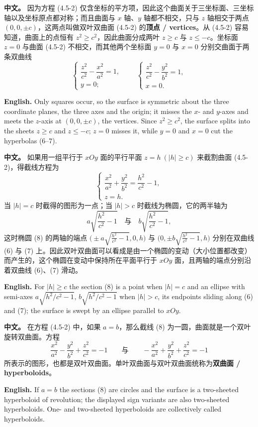 \documentclass[UTF8,11pt,a4paper]{ctexart}
\newcommand{\APS}[2]{\par\noindent\textbf{中文。} #1\par\noindent\textbf{English.} #2\par\smallskip}
\theoremstyle{definition}
\begin{document}
\APS{因为方程 (4.5-2) 仅含坐标的平方项，因此这个曲面关于三坐标面、三坐标轴以及坐标原点都对称；而且曲面与 $x$ 轴、$y$ 轴都不相交，只与 $z$ 轴相交于两点 $(0,0,\pm c)$，这两点叫做双叶双曲面 (4.5-2) 的\textbf{顶点 / vertices}。从 (4.5-2) 容易知道，曲面上的点恒有 $z^2\ge c^2$，因此曲面分成两叶 $z\ge c$ 与 $z\le -c$。坐标面 $z=0$ 与曲面 (4.5-2) 不相交，而其他两个坐标面 $y=0$ 与 $x=0$ 分别交曲面于两条双曲线
\[
\begin{cases}\dfrac{z^2}{c^2}-\dfrac{x^2}{a^2}=1,\\ y=0;\end{cases}\qquad
\begin{cases}\dfrac{z^2}{c^2}-\dfrac{y^2}{b^2}=1,\\ x=0.\end{cases}\tag{6--7}
\]
}{Only squares occur, so the surface is symmetric about the three coordinate planes, the three axes and the origin; it misses the $x$- and $y$-axes and meets the $z$-axis at $(0,0,\pm c)$, the vertices. Since $z^2\ge c^2$, the surface splits into the sheets $z\ge c$ and $z\le -c$; $z=0$ misses it, while $y=0$ and $x=0$ cut the hyperbolas (6--7).}

\APS{如果用一组平行于 $xOy$ 面的平行平面 $z=h\ (|h|\ge c)$ 来截割曲面 (4.5-2)，得截线方程为
\[
\begin{cases}\dfrac{x^2}{a^2}+\dfrac{y^2}{b^2}=\dfrac{h^2}{c^2}-1,\\ z=h.\end{cases}\tag{8}
\]
当 $|h|=c$ 时截得的图形为一点；当 $|h|>c$ 时截线为椭圆，它的两半轴为
\[
a\sqrt{\frac{h^2}{c^2}-1}\quad\text{与}\quad b\sqrt{\frac{h^2}{c^2}-1},
\]
这时椭圆 (8) 的两轴的端点 $\bigl(\pm a\sqrt{\frac{h^2}{c^2}-1},0,h\bigr)$ 与 $\bigl(0,\pm b\sqrt{\frac{h^2}{c^2}-1},h\bigr)$ 分别在双曲线 (6) 与 (7) 上。因此双叶双曲面可以看成是由一个椭圆的变动（大小位置都改变）而产生的，这个椭圆在变动中保持所在平面平行于 $xOy$ 面，且两轴的端点分别沿着双曲线 (6)、(7) 滑动。}{For $|h|\ge c$ the section (8) is a point when $|h|=c$ and an ellipse with semi-axes $a\sqrt{h^2/c^2-1}$, $b\sqrt{h^2/c^2-1}$ when $|h|>c$, its endpoints sliding along (6) and (7); the surface is swept by an ellipse parallel to $xOy$.}

\APS{在方程 (4.5-2) 中，如果 $a=b$，那么截线 (8) 为一圆，曲面就是一个双叶旋转双曲面。方程
\[
\frac{x^2}{a^2}-\frac{y^2}{b^2}+\frac{z^2}{c^2}=-1\qquad\text{与}\qquad-\frac{x^2}{a^2}+\frac{y^2}{b^2}+\frac{z^2}{c^2}=-1
\]
所表示的图形，也都是双叶双曲面。单叶双曲面与双叶双曲面统称为\textbf{双曲面 / hyperboloids}。}{If $a=b$ the sections (8) are circles and the surface is a two-sheeted hyperboloid of revolution; the displayed sign variants are also two-sheeted hyperboloids. One- and two-sheeted hyperboloids are collectively called hyperboloids.}
\end{document}
